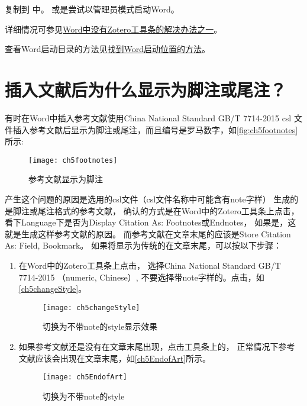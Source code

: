 \documentclass[theorem=false,mathfont=none,openany,sub3section]{easybook}
\begin{document}
{\begin{enumerate}
	复制到
	中。
	或是尝试以管理员模式启动Word。
	
	
	详细情况可参见\href{https://zhuanlan.zhihu.com/p/58931999}
	{Word中没有Zotero工具条的解决办法之一}。
	 
	\end{enumerate}
	查看Word启动目录的方法见\href{https://zhuanlan.zhihu.com/p/85513418}
	{找到Word启动位置的方法}。

\section{插入文献后为什么显示为脚注或尾注？}\label{sec:footnotes}
有时在Word中插入参考文献使用China National Standard GB/T 7714-2015 csl
文件插入参考文献后显示为脚注或尾注，而且编号是罗马数字，如\autoref{fig:ch5footnotes}所示:
\begin{figure}[ht]
	\centering
	\texttt{[image: ch5footnotes]}
	\caption{参考文献显示为脚注}
	\label{fig:ch5footnotes}
\end{figure}
产生这个问题的原因是选用的csl文件（csl文件名称中可能含有note字样）
生成的是脚注或尾注格式的参考文献，
确认的方式是在Word中的Zotero工具条上点击，
看下Language下是否为Display Citation As: Footnotes或Endnotes，
如果是，这就是生成这样参考文献的原因。
而参考文献在文章末尾的应该是Store Citation As: Field, Bookmark。 
如果将显示为传统的在文章末尾，可以按以下步骤：
\begin{enumerate}

	\item 
	在Word中的Zotero工具条上点击，
	选择China National Standard GB/T 7714-2015 （numeric, Chinese）,
	不要选择带note字样的。点击，如\autoref{ch5changeStyle}。
	\begin{figure}[ht]
		\centering
		\texttt{[image: ch5changeStyle]}
		\caption{切换为不带note的style显示效果}
		\label{ch5changeStyle}
	\end{figure}
	\item 
	如果参考文献还是没有在文章末尾出现，点击工具条上的，
	正常情况下参考文献应该会出现在文章末尾，如\autoref{ch5EndofArt}所示。
	\begin{figure}[ht]
		\centering
		\texttt{[image: ch5EndofArt]}
		\caption{切换为不带note的style}
		\label{ch5EndofArt}
	\end{figure}
\end{enumerate}


}
\end{document}
